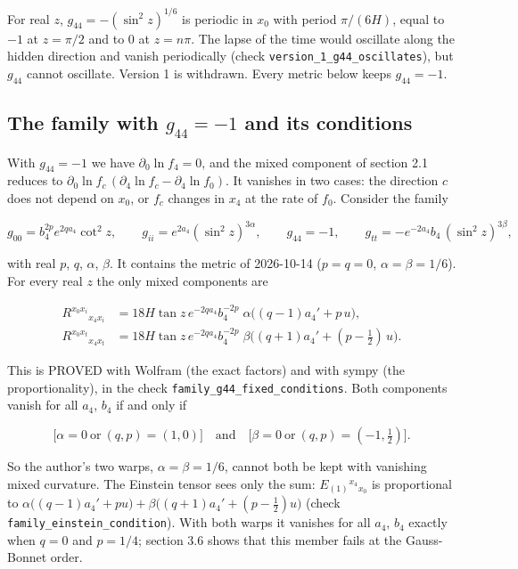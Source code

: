 \documentclass[11pt]{article}
\begin{document}
For real $z$, $g_{44} = -(\sin^2 z)^{1/6}$ is periodic in $x_0$ with period $\pi/(6H)$, equal to $-1$ at $z = \pi/2$ and to $0$ at $z = n\pi$. The lapse of the time would oscillate along the hidden direction and vanish periodically (check \texttt{version\_\allowbreak{}1\_g44\_os\allowbreak{}cillates}), but $g_{44}$ cannot oscillate. Version 1 is withdrawn. Every metric below keeps $g_{44} = -1$.

\subsection{The family with \texorpdfstring{$g_{44} = -1$}{g\_44 = -1} and its conditions}

With $g_{44} = -1$ we have $\partial_0\ln f_4 = 0$, and the mixed component of section 2.1 reduces to $\partial_0\ln f_c\,(\partial_4\ln f_c - \partial_4\ln f_0)$. It vanishes in two cases: the direction $c$ does not depend on $x_0$, or $f_c$ changes in $x_4$ at the rate of $f_0$. Consider the family

\[
g_{00} = b_4^{2p}e^{2qa_4}\cot^2 z,\qquad g_{ii} = e^{2a_4}(\sin^2 z)^{3\alpha},\qquad g_{44} = -1,\qquad g_{tt} = -e^{-2a_4}b_4\,(\sin^2 z)^{3\beta},
\]

with real $p$, $q$, $\alpha$, $\beta$. It contains the metric of 2026-10-14 ($p = q = 0$, $\alpha = \beta = 1/6$). For every real $z$ the only mixed components are

\[
\begin{aligned}
R^{x_0 x_i}{}_{x_4 x_i} &= 18H\tan z\,e^{-2qa_4}b_4^{-2p}\;\alpha\big((q-1)a_4' + p\,u\big), \\
R^{x_0 x_t}{}_{x_4 x_t} &= 18H\tan z\,e^{-2qa_4}b_4^{-2p}\;\beta\big((q+1)a_4' + (p - \tfrac12)\,u\big).
\end{aligned}
\]

This is PROVED with Wolfram (the exact factors) and with sympy (the proportionality), in the check \texttt{family\_g\allowbreak{}44\_fixed\allowbreak{}\_conditi\allowbreak{}ons}. Both components vanish for all $a_4$, $b_4$ if and only if

\[
\big[\alpha = 0 \ \text{or}\ (q, p) = (1, 0)\big]\quad\text{and}\quad\big[\beta = 0 \ \text{or}\ (q, p) = (-1, \tfrac12)\big].
\]

So the author's two warps, $\alpha = \beta = 1/6$, cannot both be kept with vanishing mixed curvature. The Einstein tensor sees only the sum: $E_{(1)}{}^{x_4}{}_{x_0}$ is proportional to $\alpha\big((q-1)a_4' + pu\big) + \beta\big((q+1)a_4' + (p-\frac12)u\big)$ (check \texttt{family\_e\allowbreak{}instein\_\allowbreak{}conditio\allowbreak{}n}). With both warps it vanishes for all $a_4$, $b_4$ exactly when $q = 0$ and $p = 1/4$; section 3.6 shows that this member fails at the Gauss-Bonnet order.
\end{document}
